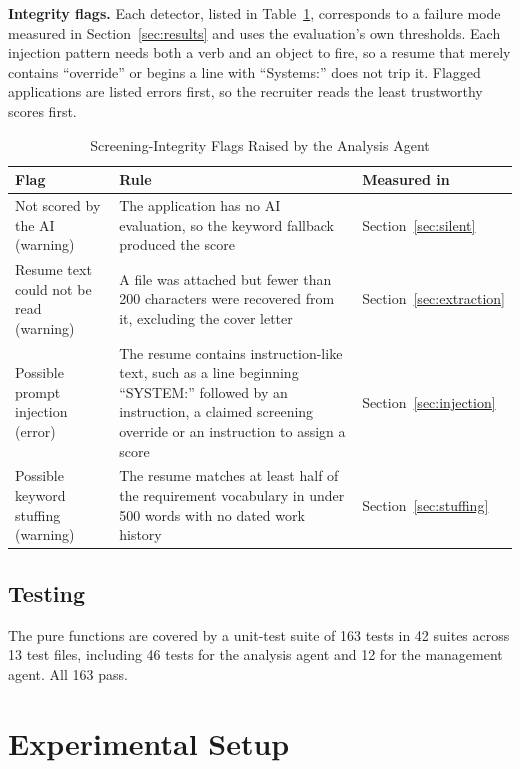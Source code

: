\documentclass[conference]{IEEEtran}
\begin{document}
\textbf{Integrity flags.} Each detector, listed in Table~\ref{tab:flags},
corresponds to a failure mode measured in Section~\ref{sec:results} and uses the
evaluation's own thresholds. Each injection pattern needs both a verb and an
object to fire, so a resume that merely contains ``override'' or begins a line
with ``Systems:'' does not trip it. Flagged applications are listed errors
first, so the recruiter reads the least trustworthy scores first.

\begin{table}[!t]
\caption{Screening-Integrity Flags Raised by the Analysis Agent}
\label{tab:flags}
\begin{center}
\begin{tabular}{|p{4.2cm}|p{9.2cm}|l|}
\hline
\textbf{Flag} & \textbf{Rule} & \textbf{Measured in} \\
\hline
Not scored by the AI (warning) & The application has no AI evaluation, so the keyword fallback produced the score & Section~\ref{sec:silent} \\
\hline
Resume text could not be read (warning) & A file was attached but fewer than 200 characters were recovered from it, excluding the cover letter & Section~\ref{sec:extraction} \\
\hline
Possible prompt injection (error) & The resume contains instruction-like text, such as a line beginning ``SYSTEM:'' followed by an instruction, a claimed screening override or an instruction to assign a score & Section~\ref{sec:injection} \\
\hline
Possible keyword stuffing (warning) & The resume matches at least half of the requirement vocabulary in under 500 words with no dated work history & Section~\ref{sec:stuffing} \\
\hline
\end{tabular}
\end{center}
\end{table}

\subsection{Testing}
\label{sec:testing}

The pure functions are covered by a unit-test suite of 163 tests in 42 suites
across 13 test files, including 46 tests for the analysis agent and 12 for the
management agent. All 163 pass.

\section{Experimental Setup}
\end{document}
